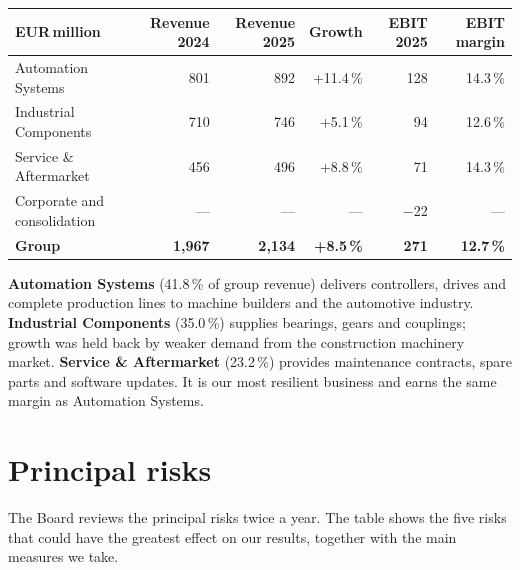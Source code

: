\documentclass[10.5pt,a4paper]{article}
\newcommand{\eur}{EUR\,}
\begin{document}
\sffamily\small
\begin{tabularx}{\linewidth}{@{}>{\raggedright\arraybackslash}X r r r r r@{}}
  \toprule
  \textbf{\eur million} & \textbf{Revenue 2024} & \textbf{Revenue 2025} & \textbf{Growth} & \textbf{EBIT 2025} & \textbf{EBIT margin} \\
  \midrule
  Automation Systems & 801 & 892 & +11.4\,\% & 128 & 14.3\,\% \\
  Industrial Components & 710 & 746 & +5.1\,\% & 94 & 12.6\,\% \\
  Service \& Aftermarket & 456 & 496 & +8.8\,\% & 71 & 14.3\,\% \\
  Corporate and consolidation & --- & --- & --- & $-$22 & --- \\
  \midrule
  \textbf{Group} & \textbf{1,967} & \textbf{2,134} & \textbf{+8.5\,\%} & \textbf{271} & \textbf{12.7\,\%} \\
  \bottomrule
\end{tabularx}
\rmfamily\normalsize

\textbf{Automation Systems} (41.8\,\% of group revenue) delivers controllers, drives and complete production lines
to machine builders and the automotive industry. \textbf{Industrial Components} (35.0\,\%) supplies bearings,
gears and couplings; growth was held back by weaker demand from the construction machinery market.
\textbf{Service \& Aftermarket} (23.2\,\%) provides maintenance contracts, spare parts and software updates. It is our most
resilient business and earns the same margin as Automation Systems.

\section{Principal risks}
The Board reviews the principal risks twice a year. The table shows the five risks that could have the
greatest effect on our results, together with the main measures we take.
\end{document}
